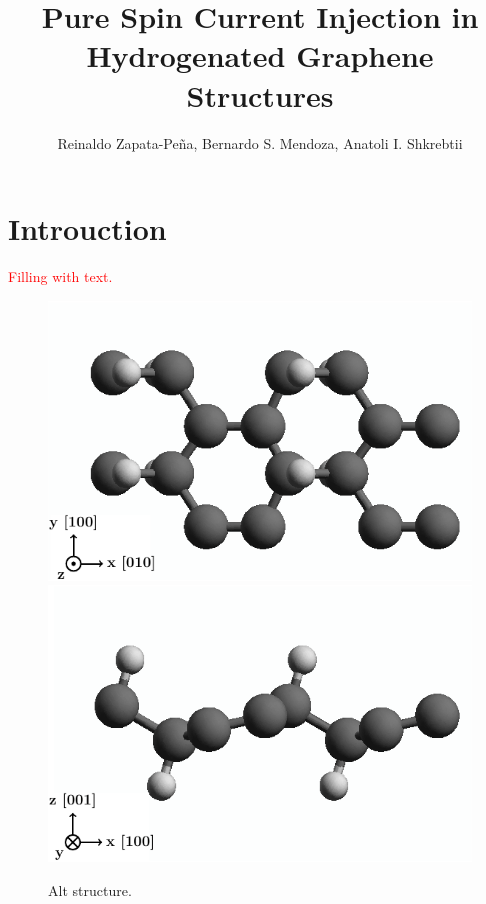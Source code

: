 \documentclass[twocolumn]{article}
\title{Pure Spin Current Injection in Hydrogenated Graphene Structures}
\author{Reinaldo Zapata-Pe\~na,
Bernardo S. Mendoza,
Anatoli I. Shkrebtii}
\date{}
\let\Oldsection\section
\renewcommand{\section}{\FloatBarrier\Oldsection}
\begin{document}
\maketitle

\section{Introuction} %
\label{sec:introuction}

\textcolor{red}{
{\huge Filling with text.}\\
\blindtext
}
\begin{figure}[h]
    \centering
    \includegraphics[width=\linewidth]{figures/altstruc1}
    \includegraphics[width=\linewidth]{figures/altstruc2}
    \caption{Alt structure.}
    \label{fig:altstruc}
\end{figure}
\end{document}

